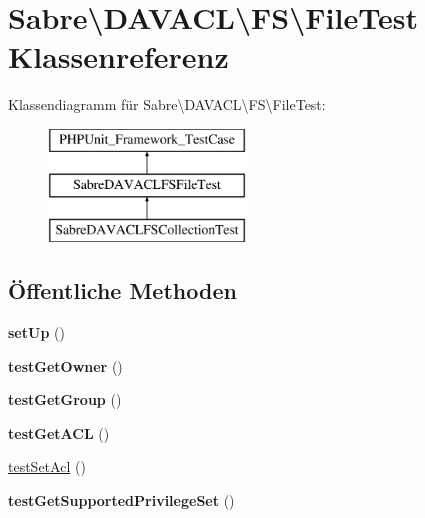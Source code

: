 \hypertarget{class_sabre_1_1_d_a_v_a_c_l_1_1_f_s_1_1_file_test}{}\section{Sabre\textbackslash{}D\+A\+V\+A\+CL\textbackslash{}FS\textbackslash{}File\+Test Klassenreferenz}
\label{class_sabre_1_1_d_a_v_a_c_l_1_1_f_s_1_1_file_test}
Klassendiagramm für Sabre\textbackslash{}D\+A\+V\+A\+CL\textbackslash{}FS\textbackslash{}File\+Test\+:\begin{figure}[H]
\begin{center}
\leavevmode
\includegraphics[height=3.000000cm]{class_sabre_1_1_d_a_v_a_c_l_1_1_f_s_1_1_file_test}
\end{center}
\end{figure}
\subsection*{Öffentliche Methoden}
\begin{DoxyCompactItemize}
\item 
\mbox{\label{class_sabre_1_1_d_a_v_a_c_l_1_1_f_s_1_1_file_test_a67a9f64559a175f2d41ec3cdfed6e3b3}} 
{\bfseries set\+Up} ()
\item 
\mbox{\label{class_sabre_1_1_d_a_v_a_c_l_1_1_f_s_1_1_file_test_abd7df907f9f68fde2165818b108b2f8b}} 
{\bfseries test\+Get\+Owner} ()
\item 
\mbox{\label{class_sabre_1_1_d_a_v_a_c_l_1_1_f_s_1_1_file_test_a6813f10b41f0748a98f7ec497aabd89d}} 
{\bfseries test\+Get\+Group} ()
\item 
\mbox{\label{class_sabre_1_1_d_a_v_a_c_l_1_1_f_s_1_1_file_test_a661295e6563f8766b1a6a6d30ca02c88}} 
{\bfseries test\+Get\+A\+CL} ()
\item 
\mbox{\hyperlink{class_sabre_1_1_d_a_v_a_c_l_1_1_f_s_1_1_file_test_a6e9a9ec83ffc659102894163f489da29}{test\+Set\+Acl}} ()
\item 
\mbox{\label{class_sabre_1_1_d_a_v_a_c_l_1_1_f_s_1_1_file_test_a991a7242c8576379834ce9888e950853}} 
{\bfseries test\+Get\+Supported\+Privilege\+Set} ()
\end{DoxyCompactItemize}
